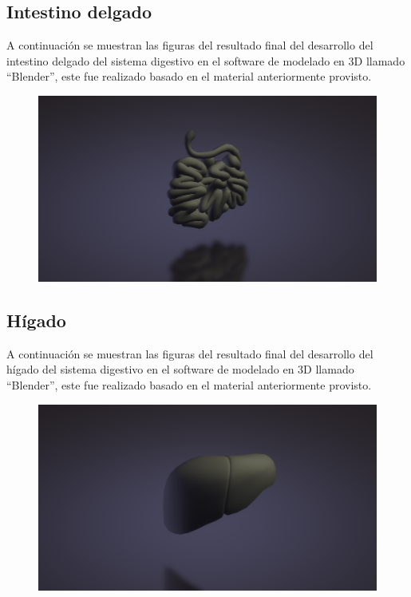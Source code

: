 \subsection{Intestino delgado}
A continuación se muestran las figuras del resultado final del desarrollo del intestino delgado del sistema digestivo en el software de modelado en 3D llamado “Blender”, este fue realizado basado en el material anteriormente provisto.\\
\begin{figure}[H]
	\begin{center}
 		\includegraphics[width = .5\textwidth]{source/images/image69.png}
	\end{center} 
\end{figure}

\subsection{Hígado}
A continuación se muestran las figuras del resultado final del desarrollo del hígado del sistema digestivo en el software de modelado en 3D llamado “Blender”, este fue realizado basado en el material anteriormente provisto.\\
\begin{figure}[H]
	\begin{center}
 		\includegraphics[width = .5\textwidth]{source/images/image17.png}
	\end{center} 
\end{figure}

